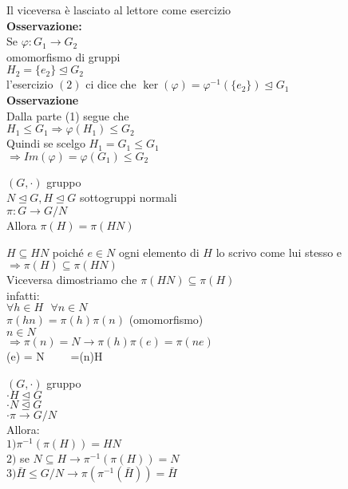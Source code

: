 \documentclass[12px]{article}
\begin{document}
	Il viceversa è lasciato  al lettore come esercizio\\
	 \textbf{Osservazione:}\\
	 Se $ \varphi:G_1 \rightarrow G_2$\\
	 omomorfismo di gruppi\\
	 $H_2 = \lbrace e_2 \rbrace \trianglelefteq G_2$\\
	 l'esercizio $(2)$ ci dice che  $\ker( \varphi) = \varphi^{-1}(\lbrace e_2\rbrace)\trianglelefteq G_1$\\
	 \textbf{Osservazione}\\
	 Dalla parte (1) segue che\\
	 $H_1\leq G_1 \Rightarrow \varphi(H_1)\leq G_2$ \\
	 Quindi  se scelgo $H_1=G_1\leq G_1$\\
	 $ \Rightarrow Im( \varphi) = \varphi(G_1)\leq G_2$ 
	 \begin{lemm}
	 	
	 $(G,\cdot)$ gruppo\\
	 $N\trianglelefteq G, H\trianglelefteq G$ sottogruppi normali\\
	  $\pi: G \rightarrow G/N$\\
	  Allora $\pi(H) = \pi(HN)$\\
	 \end{lemm}
	  \begin{dimo}
	  	$H\subseteq HN$ poiché $e\in N$ ogni elemento di  $H$ lo scrivo come lui stesso e $ \Rightarrow \pi(H)\subseteq \pi(HN)$ \\
		Viceversa dimostriamo che $\pi(HN) \subseteq \pi(H)$\\
		infatti:\\
		 $\forall h\in H \ \ \ \forall n\in N$\\
		  $\pi(hn)=\pi(h)\pi(n)$ (omomorfismo)\\
		   $n\in N$\\
		    $ \Rightarrow \pi(n) = N \rightarrow \pi(h)\pi(e) = \pi(ne)$ \\
		    \pi(e) = N \ \ \ \ =\pi(n)\in \pi H
	  \end{dimo}
	  \begin{lemm}
	  	$(G,\cdot)$ gruppo\\
		$\cdot H\trianglelefteq G$\\
		$\cdot N\trianglelefteq G$\\
		$\cdot \pi \rightarrow G/N$\\
		Allora:\\
		$1)\pi^{-1}(\pi(H))=HN$\\
		$2)$ se $N\subseteq H \rightarrow\pi^{-1}(\pi(H)) = N$\\
		$3) \bar H\leq G/N \rightarrow \pi(\pi^{-1}(\bar H)) = \bar H$

	  \end{lemm}
\end{document}
